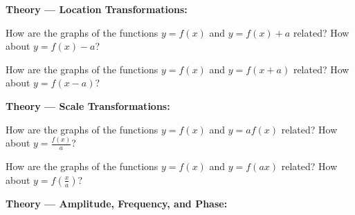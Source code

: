 \documentclass{article}
\begin{document}
\clearpage


{\bf Theory --- Location Transformations:}

\vspace{5mm}

How are the graphs of the functions $y=f(x)$ and $y=f(x)+a$ related? How about $y=f(x)-a$?

\vfil

How are the graphs of the functions $y=f(x)$ and $y=f(x+a)$ related? How about $y=f(x-a)$?

\vfil


\clearpage

\textbf{Theory --- Scale Transformations:}

\vspace{5mm}

How are the graphs of the functions $y=f(x)$ and $y=af(x)$ related? How about $y=\frac{f(x)}{a}$?

\vfil

How are the graphs of the functions $y=f(x)$ and $y=f(ax)$ related? How about $y=f\left(\frac{x}{a}\right)$?


\clearpage


\textbf{Theory --- Amplitude, Frequency, and Phase:}
\end{document}
